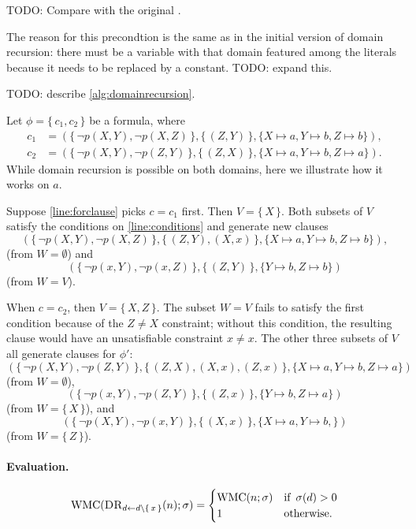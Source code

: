 TODO: Compare with the original \citep{DBLP:conf/nips/Broeck11}.

The reason for this precondtion is the same as in the initial version of domain recursion: there must be a variable with that domain featured among the literals because it needs to be replaced by a constant. TODO: expand this.

TODO: describe \cref{alg:domainrecursion}.

\begin{example}
  Let $\phi = \{\, c_1, c_2 \,\}$ be a formula, where
  \begin{align*}
    c_1 &= (\{\, \neg p(X, Y), \neg p(X, Z) \,\}, \{\, (Z, Y) \,\}, \{ X \mapsto a, Y \mapsto b, Z \mapsto b \}), \\
    c_2 &= (\{\, \neg p(X, Y), \neg p(Z, Y) \,\}, \{\, (Z, X) \,\}, \{ X \mapsto a, Y \mapsto b, Z \mapsto a \}).
  \end{align*}
  While domain recursion is possible on both domains, here we illustrate how it works on $a$.

  Suppose \cref{line:forclause} picks $c = c_1$ first. Then $V = \{\, X \,\}$. Both subsets of $V$ satisfy the conditions on \cref{line:conditions} and generate new clauses
  \[
  (\{\, \neg p(X, Y), \neg p(X, Z) \,\}, \{\, (Z, Y), (X, x) \,\}, \{ X \mapsto a, Y \mapsto b, Z \mapsto b \}),
  \]
  (from $W = \emptyset$) and
  \[
  (\{\, \neg p(x, Y), \neg p(x, Z) \,\}, \{\, (Z, Y) \,\}, \{ Y \mapsto b, Z \mapsto b \})
  \]
  (from $W = V$).

  When $c = c_2$, then $V = \{\, X, Z \,\}$. The subset $W = V$ fails to satisfy the first condition because of the $Z \ne X$ constraint; without this condition, the resulting clause would have an unsatisfiable constraint $x \ne x$. The other three subsets of $V$ all generate clauses for $\phi'$:
  \[
  (\{\, \neg p(X, Y), \neg p(Z, Y) \,\}, \{\, (Z, X), (X, x), (Z, x) \,\}, \{ X \mapsto a, Y \mapsto b, Z \mapsto a \})
  \]
  (from $W = \emptyset$),
  \[
  (\{\, \neg p(x, Y), \neg p(Z, Y) \,\}, \{\, (Z, x) \,\}, \{ Y \mapsto b, Z \mapsto a \})
  \]
  (from $W = \{\, X \,\}$), and
  \[
  (\{\, \neg p(X, Y), \neg p(x, Y) \,\}, \{\, (X, x) \,\}, \{ X \mapsto a, Y \mapsto b, \})
  \]
  (from $W = \{\, Z \,\}$).
\end{example}

\paragraph{Evaluation.}
\[
\operatorname{WMC}(\operatorname{\textsc{DR}}_{d \gets d \setminus \{\, x \,\}}(n); \operatorname{\sigma}) =
\begin{cases}
  \operatorname{WMC}(n; \operatorname{\sigma}) & \text{if } \operatorname{\sigma}(d) > 0 \\
  1 & \text{otherwise.}
\end{cases}
\]

